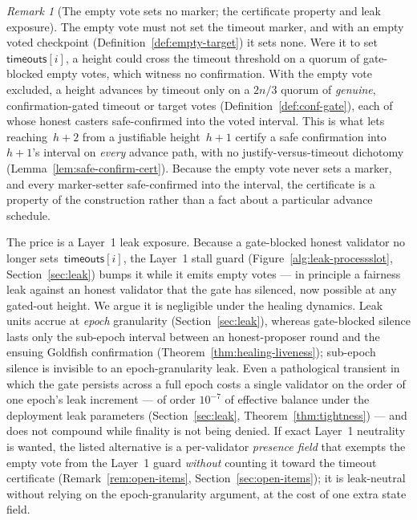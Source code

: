 \ifx\litemode\undefined\documentclass{article}\fi
\newcommand{\timeouts}{\mathsf{timeouts}}
\theoremstyle{plain}
\theoremstyle{definition}
\theoremstyle{remark}
\newtheorem{remark}[theorem]{Remark}
\begin{document}
\begin{remark}[The empty vote sets no marker; the certificate property and leak exposure]\label{rem:empty-vote-marker}
The empty vote must not set the timeout marker, and with an empty voted
checkpoint (Definition~\ref{def:empty-target}) it sets none.  Were it to
set~$\timeouts[i]$, a height could cross the timeout threshold on a quorum of
gate-blocked empty votes, which witness no confirmation.  With the empty vote
excluded, a height advances by timeout only on a $2n/3$ quorum of
\emph{genuine}, confirmation-gated timeout or target votes
(Definition~\ref{def:conf-gate}), each of whose honest casters safe-confirmed
into the voted interval.  This is what lets reaching~$h+2$ from a justifiable
height~$h+1$ certify a safe confirmation into~$h+1$'s interval on \emph{every}
advance path, with no justify-versus-timeout dichotomy
(Lemma~\ref{lem:safe-confirm-cert}).  Because the empty vote never sets a
marker, and every marker-setter safe-confirmed into the interval, the
certificate is a property of the construction rather than a fact about a
particular advance schedule.

The price is a Layer~1 leak exposure.  Because a gate-blocked honest validator
no longer sets~$\timeouts[i]$, the Layer~1 stall guard
(Figure~\ref{alg:leak-processslot}, Section~\ref{sec:leak}) bumps it while it
emits empty votes --- in principle a fairness leak against an honest validator
that the gate has silenced, now possible at any gated-out height.  We argue it
is negligible under the healing dynamics.  Leak units accrue at \emph{epoch}
granularity (Section~\ref{sec:leak}), whereas gate-blocked silence lasts only
the sub-epoch interval between an honest-proposer round and the ensuing Goldfish
confirmation (Theorem~\ref{thm:healing-liveness}); sub-epoch silence is
invisible to an epoch-granularity leak.  Even a pathological transient in which
the gate persists across a full epoch costs a single validator on the order of
one epoch's leak increment --- of order $10^{-7}$ of effective balance under the
deployment leak parameters (Section~\ref{sec:leak}, Theorem~\ref{thm:tightness})
--- and does not compound while finality is not being denied.  If exact Layer~1
neutrality is wanted, the listed alternative is a per-validator
\emph{presence field} that exempts the empty vote from the Layer~1 guard
\emph{without} counting it toward the timeout certificate
(Remark~\ref{rem:open-items}, Section~\ref{sec:open-items}); it is leak-neutral
without relying on the epoch-granularity argument, at the cost of one extra
state field.
\end{remark}
\end{document}
